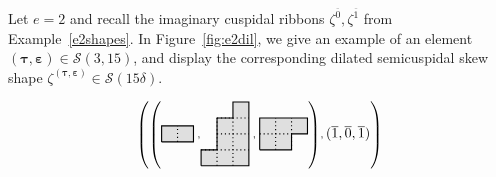 \documentclass[Unicode,ALCO]{cedram}
\newcommand{\SSSS}{\mathcal{S}}
\newcommand{\SSSSS}{\boldsymbol{\mathcal{S}}}
\newcommand{\0}{{\bar 0}}
\newcommand{\btau}{\boldsymbol{\tau}}
\newcommand{\bbep}{\boldsymbol{\varepsilon}}
\newcommand{\hackcenter}[1]{
 \xy (0,0)*{#1}; \endxy}
\begin{document}
\begin{exam}\label{e2dil}
Let \(e=2\) and recall the imaginary cuspidal ribbons \(\zeta^{\overline{0}}, \zeta^{\overline{1}}\) from Example~\ref{e2shapes}. In Figure~\ref{fig:e2dil}, we give an example of an element \((\btau, \bbep) \in \SSSSS(3,15)\), and display the corresponding dilated semicuspidal skew shape \(\zeta^{(\btau,\bbep)} \in \SSSS(15\delta)\).
\begin{figure}
\begin{align*}
{}
\substack{
\left(
\left(
\hackcenter{
\begin{tikzpicture}[scale=0.4]
\draw[thick, fill=lightgray!50] (0,0)--(2,0)--(2,1)--(0,1)--(0,0);
\draw[thick, dotted] (1,0)--(1,1);
\end{tikzpicture}
}
\;
,
\hackcenter{
\begin{tikzpicture}[scale=0.4]
\draw[thick, fill=lightgray!50] (0,0)--(3,0)--(3,4)--(2,4)--(2,3)--(1,3)--(1,1)--(0,1)--(0,0);
\draw[thick, dotted] (0,1)--(3,1);
\draw[thick, dotted] (1,2)--(3,2);
\draw[thick, dotted] (1,3)--(3,3);
\draw[thick, dotted] (1,0)--(1,3);
\draw[thick, dotted] (2,0)--(2,3);
\end{tikzpicture}
}
\;
,
\;
\hackcenter{
\begin{tikzpicture}[scale=0.4]
\draw[thick, fill=lightgray!50] (0,0)--(2,0)--(2,1)--(3,1)--(3,2)--(0,2)--(0,0);
\draw[thick, dotted] (0,1)--(2,1);
\draw[thick, dotted] (1,0)--(1,2);
\draw[thick, dotted] (2,0)--(2,2);
\end{tikzpicture}
}
\right)
,
\displaystyle (\overline 1, \overline 0,  \overline 1)
\right)
\\
{}
\\
{}
\\
{}
\\
{}
\\
{}
\\
{}
\\
{}
\\
{}
\\
{}
\\
{}
\\
{}
\\
{}
\\
{}
\\
{}
\\
{}
\\
{}
\\
{}
\\
{}
\\
{}
\\
{}
\\
{}
\\
}
\end{align*}
\end{figure}
\end{exam}
\end{document}
